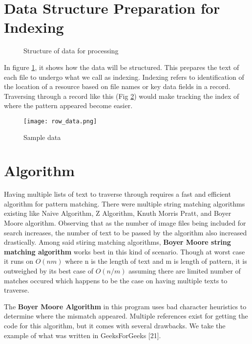 \section*{Data Structure Preparation for Indexing}

\begin{figure}[hbt!]
    \center
    \noindent{}
    \caption{Structure of data for processing}
    \label{fig:data_structure1}
\end{figure}

\hspace\parindent
In figure \ref{fig:data_structure1}, it shows how the data will be structured. This prepares the
text of each file to undergo what we call as indexing. Indexing refers to identification of the
location of a resource based on file names or key data fields in a record. Traversing through a
record like this (Fig \ref{fig:indexing}) would make tracking the index of where the pattern appeared become easier.

\begin{figure}[hbt!]
   \center
   \noindent\texttt{[image: row\_data.png]}
   \caption{Sample data}
   \label{fig:indexing}
\end{figure}

\section*{Algorithm}

\hspace\parindent
Having multiple lists of text to traverse through requires a fast and efficient algorithm for
pattern matching. There were multiple string matching algorithms existing like Naive Algorithm, Z
Algorithm, Knuth Morris Pratt, and Boyer Moore algorithm.  Observing that
as the number of image files being included for search increases, the number of text to be passed by
the algorithm also increased drastically. Among said stiring matching algorithms,
\textbf{Boyer Moore string matching algorithm} works best in this kind of scenario. Though at worst
case it runs on $O(nm)$ where n is the length of text and m is length of pattern, it is outweighed
by its best case of $O(n/m)$ assuming there are limited number of matches occured which happens to
be the case on having multiple texts to traverse.

\hfill

The \textbf{Boyer Moore Algorithm} in this program uses bad character heuristics to determine where
the mismatch appeared. Multiple references exist for getting the code for this algorithm, but it
comes with several drawbacks. We take the example of what was written in GeeksForGeeks [21]. 

